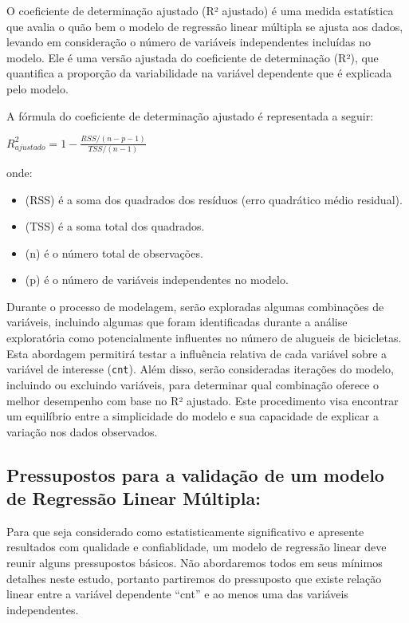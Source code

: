 \documentclass[
  letterpaper,
  DIV=11,
  numbers=noendperiod]{scrartcl}
\providecommand{\tightlist}{%
  \setlength{\itemsep}{0pt}\setlength{\parskip}{0pt}}\usepackage{longtable,booktabs,array}
\begin{document}
O coeficiente de determinação ajustado (R² ajustado) é uma medida
estatística que avalia o quão bem o modelo de regressão linear múltipla
se ajusta aos dados, levando em consideração o número de variáveis
independentes incluídas no modelo. Ele é uma versão ajustada do
coeficiente de determinação (R²), que quantifica a proporção da
variabilidade na variável dependente que é explicada pelo modelo.

A fórmula do coeficiente de determinação ajustado é representada a
seguir:

\(R^2_{ajustado} = 1 - \frac{RSS / (n - p - 1)}{TSS / (n - 1)}\)

onde:

\begin{itemize}
\tightlist
\item
  (RSS) é a soma dos quadrados dos resíduos (erro quadrático médio
  residual).
\item
  (TSS) é a soma total dos quadrados.
\item
  (n) é o número total de observações.
\item
  (p) é o número de variáveis independentes no modelo.
\end{itemize}

Durante o processo de modelagem, serão exploradas algumas combinações de
variáveis, incluindo algumas que foram identificadas durante a análise
exploratória como potencialmente influentes no número de alugueis de
bicicletas. Esta abordagem permitirá testar a influência relativa de
cada variável sobre a variável de interesse (\texttt{cnt}). Além disso,
serão consideradas iterações do modelo, incluindo ou excluindo
variáveis, para determinar qual combinação oferece o melhor desempenho
com base no R² ajustado. Este procedimento visa encontrar um equilíbrio
entre a simplicidade do modelo e sua capacidade de explicar a variação
nos dados observados.

\subsection{Pressupostos para a validação de um modelo de Regressão
Linear
Múltipla:}\label{pressupostos-para-a-validauxe7uxe3o-de-um-modelo-de-regressuxe3o-linear-muxfaltipla}

Para que seja considerado como estatisticamente significativo e
apresente resultados com qualidade e confiablidade, um modelo de
regressão linear deve reunir alguns pressupostos básicos. Não
abordaremos todos em seus mínimos detalhes neste estudo, portanto
partiremos do pressuposto que existe relação linear entre a variável
dependente ``cnt'' e ao menos uma das variáveis independentes.
\end{document}
